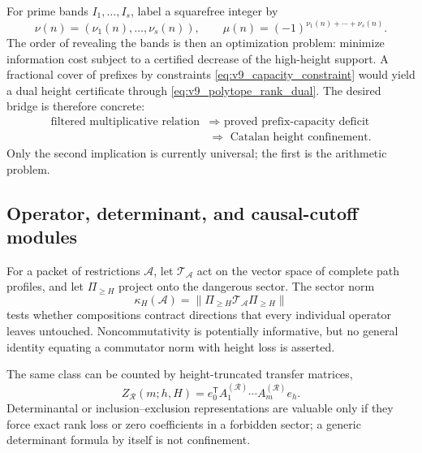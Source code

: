 \documentclass[11pt]{amsart}
\numberwithin{equation}{section}
\theoremstyle{plain}
\theoremstyle{definition}
\theoremstyle{remark}
\begin{document}
For prime bands $I_1,\ldots,I_s$, label a squarefree integer by
\begin{equation}
\nu(n)=(\nu_1(n),\ldots,\nu_s(n)),\qquad
\mu(n)=(-1)^{\nu_1(n)+\cdots+\nu_s(n)}.
\label{eq:v9_prime_band_color}
\end{equation}
The order of revealing the bands is then an optimization problem: minimize
information cost subject to a certified decrease of the high-height support.
A fractional cover of prefixes by constraints \eqref{eq:v9_capacity_constraint}
would yield a dual height certificate through \eqref{eq:v9_polytope_rank_dual}.
The desired bridge is therefore concrete:
\begin{equation}
\boxed{
\begin{aligned}
\text{filtered multiplicative relation}
&\Longrightarrow\text{ proved prefix-capacity deficit}\\
&\Longrightarrow\text{ Catalan height confinement}.
\end{aligned}}
\label{eq:v9_collective_bridge}
\end{equation}
Only the second implication is currently universal; the first is the
arithmetic problem.

\subsection{Operator, determinant, and causal-cutoff modules}

For a packet of restrictions $\mathscr A$, let
$\mathcal T_{\mathscr A}$ act on the vector space of complete path profiles,
and let $\Pi_{\ge H}$ project onto the dangerous sector.  The sector norm
\begin{equation}
\kappa_H(\mathscr A)=
\|\Pi_{\ge H}\mathcal T_{\mathscr A}\Pi_{\ge H}\|
\label{eq:v9_sector_operator}
\end{equation}
tests whether compositions contract directions that every individual operator
leaves untouched.  Noncommutativity is potentially informative, but no general
identity equating a commutator norm with height loss is asserted.

The same class can be counted by height-truncated transfer matrices,
\begin{equation}
Z_{\mathscr R}(m;h,H)
=e_0^{\mathsf T}A_1^{(\mathscr R)}\cdots A_m^{(\mathscr R)}e_h.
\label{eq:v9_transfer_product}
\end{equation}
Determinantal or inclusion--exclusion representations are valuable only if
they force exact rank loss or zero coefficients in a forbidden sector; a
generic determinant formula by itself is not confinement.
\end{document}
